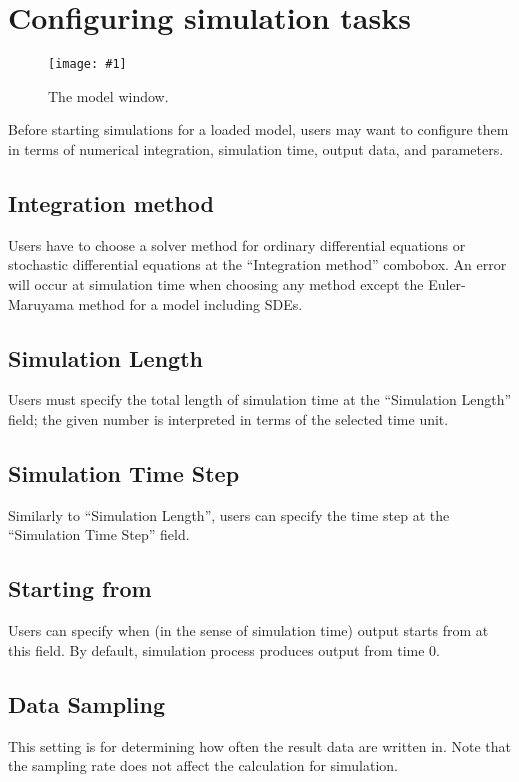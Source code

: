 \documentclass[a4paper,10pt]{report}
\newcommand\FigureOfImage[2]{\begin{figure}[h]
  \centering
  \texttt{[image: \#1]}
  \caption{#2}\label{fig:#1}
\end{figure}}
\begin{document}
\section{Configuring simulation tasks}
\FigureOfImage{lr}{The model window.}
Before starting simulations for a loaded model, users may want to configure them
in terms of numerical integration, simulation time, output data, and parameters.

\subsection{Integration method}
Users have to choose a solver method for ordinary differential equations or
stochastic differential equations at the ``Integration method'' combobox.
An error will occur at simulation time when choosing any method except
the Euler-Maruyama method for a model including SDEs.

\subsection{Simulation Length}
Users must specify the total length of simulation time at the ``Simulation Length''
field; the given number is interpreted in terms of the selected time unit.

\subsection{Simulation Time Step}
Similarly to ``Simulation Length'', users can specify the time step at the
``Simulation Time Step'' field.

\subsection{Starting from}
Users can specify when (in the sense of simulation time) output starts from
at this field. By default, simulation process produces output from time 0.

\subsection{Data Sampling}
This setting is for determining how often the result data are written in.
Note that the sampling rate does not affect the calculation for simulation.
\end{document}
